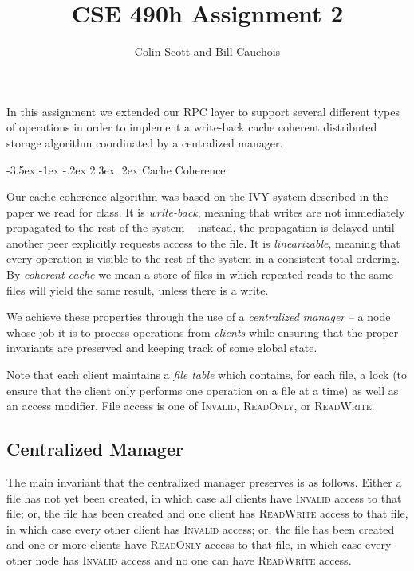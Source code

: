 \documentclass[12pt]{article}	%
\title{CSE 490h Assignment 2}
\author{
Colin Scott and Bill Cauchois \\
}
\makeatletter
\renewcommand\section{\@startsection{section}{1}{\z@}%
                                 {-3.5ex \@plus -1ex \@minus -.2ex}%
                                 {2.3ex \@plus.2ex}%
                                 {\normalfont\large\bfseries}}
\makeatother
\begin{document}
\maketitle

In this assignment we extended our RPC layer to support several different types of operations in order to implement a write-back cache coherent distributed storage algorithm coordinated by a centralized manager.

\section{Cache Coherence}

Our cache coherence algorithm was based on the IVY system described in the paper we read for class. It is \emph{write-back}, meaning that writes are not immediately propagated to the rest of the system -- instead, the propagation is delayed until another peer explicitly requests access to the file. It is \emph{linearizable}, meaning that every operation is visible to the rest of the system in a consistent total ordering. By \emph{coherent cache} we mean a store of files in which repeated reads to the same files will yield the same result, unless there is a write.

We achieve these properties through the use of a \emph{centralized manager} -- a node whose job it is to process operations from \emph{clients} while ensuring that the proper invariants are preserved and keeping track of some global state.

Note that each client maintains a \emph{file table} which contains, for each file, a lock (to ensure that the client only performs one operation on a file at a time) as well as an access modifier. File access is one of \textsc{Invalid}, \textsc{ReadOnly}, or \textsc{ReadWrite}.

\subsection{Centralized Manager}

The main invariant that the centralized manager preserves is as follows. Either a file has not yet been created, in which case all clients have \textsc{Invalid} access to that file; or, the file has been created and one client has \textsc{ReadWrite} access to that file, in which case every other client has \textsc{Invalid} access; or, the file has been created and one or more clients have \textsc{ReadOnly} access to that file, in which case every other node has \textsc{Invalid} access and no one can have \textsc{ReadWrite} access.
\end{document}
